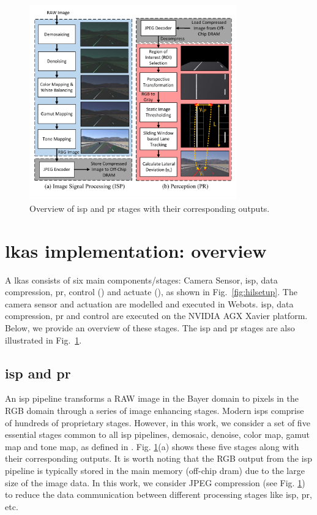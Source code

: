 \begin{figure}[t]
    \centering
    \includegraphics[width= 0.8\textwidth]{figs/isp_per.pdf}
    \caption{{Overview of \gls{isp} and \gls{pr} stages with their corresponding outputs.}}
    \label{fig:isp}
\end{figure}

\section{\texorpdfstring{\Gls{lkas}}{LKAS} implementation: overview}\label{lkas_algo}
A \gls{lkas} consists of six main components/stages: Camera Sensor, \gls{isp}, data compression, \gls{pr}, control (\taskC) and actuate (\taskA), as shown in Fig.\ \ref{fig:hilsetup}. The camera sensor and actuation are modelled and executed in Webots. \gls{isp}, data compression, \gls{pr} and control are executed on the NVIDIA AGX Xavier platform. Below, we provide an overview of these stages. The \gls{isp} and \gls{pr} stages are also illustrated in Fig.\ \ref{fig:isp}.

\noindent
\subsection{\Acrfull{isp} and \acrfull{pr}}
\par An \gls{isp} pipeline transforms a RAW image in the Bayer domain to pixels in the RGB domain through a series of image enhancing stages. Modern \glspl{isp} comprise of hundreds of proprietary stages. However, in this work, we consider a set of five essential stages common to all \gls{isp} pipelines, demosaic, denoise, color map, gamut map and tone map, as defined in \cite{buckler}. Fig. \ref{fig:isp}(a) shows these five stages along with their corresponding outputs. It is worth noting that the RGB output from the \gls{isp} pipeline is typically stored in the main memory (off-chip \gls{dram}) due to the large size of the image data. In this work, we consider JPEG compression (see Fig. \ref{fig:isp}) to reduce the data communication between different processing stages like \gls{isp}, \gls{pr}, etc.  

